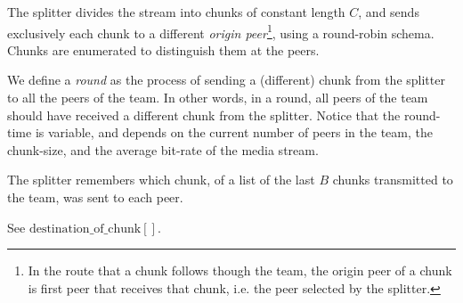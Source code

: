 
\label{sec:feeding_the_team}

The splitter divides the stream into chunks of constant length $C$,
and sends exclusively each chunk to a different \emph{origin
  peer}\footnote{In the route that a chunk follows though the team,
  the origin peer of a chunk is first peer that receives that chunk,
  i.e. the peer selected by the splitter.}, using a round-robin
schema. Chunks are enumerated to distinguish them at the peers.

\begin{comment}
More details about the implementation
are available in Fig.~\ref{fig:chunk_generation}.


\begin{figure*}
  \fig{500}{5cm}{DBS_splitter_feed} \caption{Chunk
    generation at the splitter and their transmission to the
    team.\label{fig:chunk_generation}}
\end{figure*}
\end{comment}

We define a \emph{round} as the process of sending a (different) chunk
from the splitter to all the peers of the team. In other words, in a
round, all peers of the team should have received a different chunk
from the splitter. Notice that the round-time is variable, and depends
on the current number of peers in the team, the chunk-size, and the
average bit-rate of the media stream.

The splitter remembers which chunk, of a list of the last $B$ chunks
transmitted to the team, was sent to each peer.

\begin{notex}
  See \href{https://github.com/P2PSP/simulator/blob/f0c73be1817e7d3b816cc61cd2c8e59b17f9a0e6/src/core/splitter_dbs.py#L296}{$\text{destination\_of\_chunk}[]$}.
\end{notex}

\begin{comment}
(in a team) as the time necessary to send two consecutive chunks from
  the splitter (of such team) to the same peer, using the
  round-robing. This time is variable and depends on $|T|$, $C$, and
  the average bit-rate of the media, $A$.
\end{comment}

